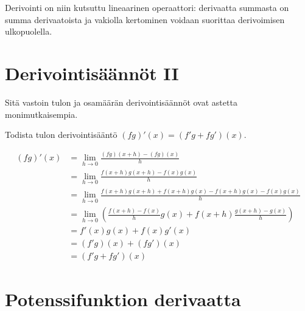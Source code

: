 Derivointi on niin kutsuttu lineaarinen operaattori: derivaatta summasta on summa derivaatoista ja
vakiolla kertominen voidaan suorittaa derivoimisen ulkopuolella.

\section{Derivointisäännöt II}

Sitä vastoin tulon ja osamäärän derivointisäännöt ovat astetta monimutkaisempia.


\begin{esimerkki}
	Todista tulon derivointisääntö $(fg)'(x) = (f'g+fg')(x)$.
	\begin{esimratk}
		\begin{align*}
			(fg)'(x) &= \lim\limits_{h \to 0} \frac{(fg)(x+h)-(fg)(x)}{h} \\
					 &= \lim\limits_{h \to 0} \frac{f(x+h)g(x+h)-f(x)g(x)}{h} \\
					 &= \lim\limits_{h \to 0} \frac{f(x+h)g(x+h)+f(x+h)g(x)-f(x+h)g(x)-f(x)g(x)}{h} \\
					 &= \lim\limits_{h \to 0} (\frac{f(x+h)-f(x)}{h} g(x) + f(x+h) \frac{g(x+h)-g(x)}{h}) \\
					 &= f'(x)g(x) + f(x)g'(x) \\
					 &= (f'g)(x) + (fg')(x) \\
					 &= (f'g + fg')(x)
		\end{align*}
	\end{esimratk}
\end{esimerkki}

\section{Potenssifunktion derivaatta}


